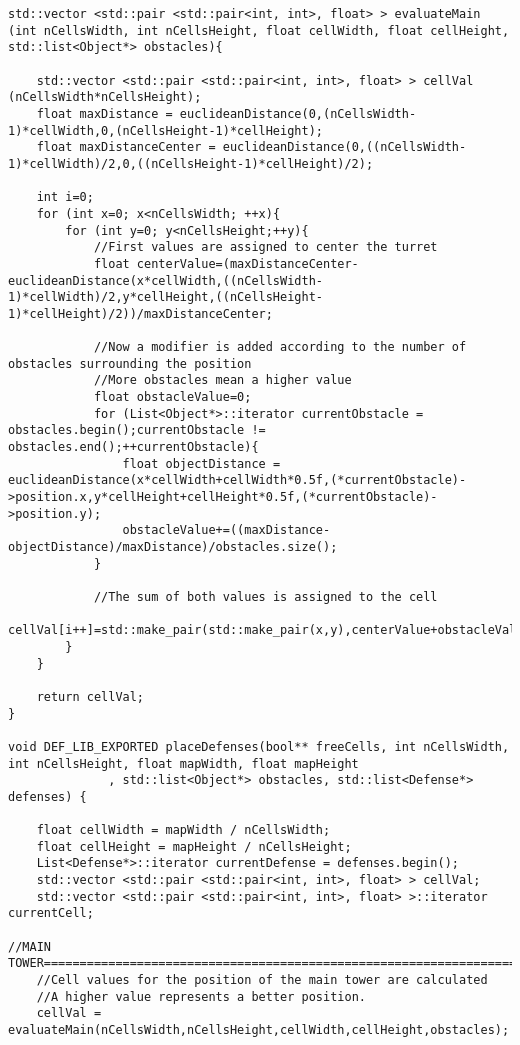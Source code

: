 \begin{lstlisting}
std::vector <std::pair <std::pair<int, int>, float> > evaluateMain (int nCellsWidth, int nCellsHeight, float cellWidth, float cellHeight, std::list<Object*> obstacles){

	std::vector <std::pair <std::pair<int, int>, float> > cellVal (nCellsWidth*nCellsHeight);
	float maxDistance = euclideanDistance(0,(nCellsWidth-1)*cellWidth,0,(nCellsHeight-1)*cellHeight);
    float maxDistanceCenter = euclideanDistance(0,((nCellsWidth-1)*cellWidth)/2,0,((nCellsHeight-1)*cellHeight)/2);
	
	int i=0;
	for (int x=0; x<nCellsWidth; ++x){
		for (int y=0; y<nCellsHeight;++y){
			//First values are assigned to center the turret
			float centerValue=(maxDistanceCenter-euclideanDistance(x*cellWidth,((nCellsWidth-1)*cellWidth)/2,y*cellHeight,((nCellsHeight-1)*cellHeight)/2))/maxDistanceCenter;
			
			//Now a modifier is added according to the number of obstacles surrounding the position
			//More obstacles mean a higher value
			float obstacleValue=0;
			for (List<Object*>::iterator currentObstacle = obstacles.begin();currentObstacle != obstacles.end();++currentObstacle){
				float objectDistance = euclideanDistance(x*cellWidth+cellWidth*0.5f,(*currentObstacle)->position.x,y*cellHeight+cellHeight*0.5f,(*currentObstacle)->position.y);
				obstacleValue+=((maxDistance-objectDistance)/maxDistance)/obstacles.size();
			}

			//The sum of both values is assigned to the cell
			cellVal[i++]=std::make_pair(std::make_pair(x,y),centerValue+obstacleValue);
		}
	}

	return cellVal;
}

void DEF_LIB_EXPORTED placeDefenses(bool** freeCells, int nCellsWidth, int nCellsHeight, float mapWidth, float mapHeight
              , std::list<Object*> obstacles, std::list<Defense*> defenses) {

	float cellWidth = mapWidth / nCellsWidth;
    float cellHeight = mapHeight / nCellsHeight;
    List<Defense*>::iterator currentDefense = defenses.begin();
    std::vector <std::pair <std::pair<int, int>, float> > cellVal;
    std::vector <std::pair <std::pair<int, int>, float> >::iterator currentCell;

//MAIN TOWER==============================================================================
    //Cell values for the position of the main tower are calculated
	//A higher value represents a better position.
	cellVal = evaluateMain(nCellsWidth,nCellsHeight,cellWidth,cellHeight,obstacles);
	

\end{lstlisting}
